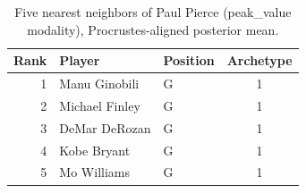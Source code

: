 \begin{table}[htbp]
  \centering\small
  \begin{tabular}{rllc}
    \toprule
    Rank & Player & Position & Archetype \\
    \midrule
    1 & Manu Ginobili & G & 1 \\
    2 & Michael Finley & G & 1 \\
    3 & DeMar DeRozan & G & 1 \\
    4 & Kobe Bryant & G & 1 \\
    5 & Mo Williams & G & 1 \\
    \bottomrule
  \end{tabular}
  \caption{Five nearest neighbors of Paul Pierce (peak_value modality), Procrustes-aligned posterior mean.}
  \label{tab:Paul_Pierce_neighbors_peak_value}
\end{table}

